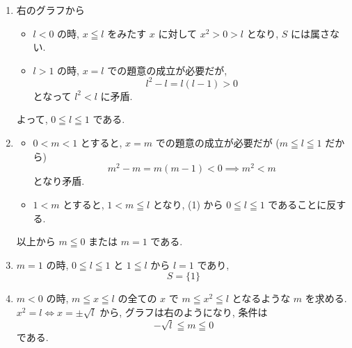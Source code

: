 \documentclass[../main.tex]{subfiles}
\begin{document}
\begin{enumerate}
  \item[(1)] 右のグラフから
    \begin{itemize}
      \item $l < 0$ の時, $x \leqq l$ をみたす $x$ に対して $x^2 > 0 > l$ となり, $S$ には属さない.
      \item $l > 1$ の時, $x = l$ での題意の成立が必要だが,
        \[
          l^2 - l = l(l-1) > 0
        \]
        となって $l^2 < l$ に矛盾.
    \end{itemize}
    よって, $0 \leqq l \leqq 1$ である.

    \begin{center}
    \end{center}

  \item[(2)]
    \begin{itemize}
      \item $0 < m < 1$ とすると, $x = m$ での題意の成立が必要だが ($m \leqq l \leqq 1$ だから)
        \[
          m^2 - m = m(m-1) < 0 \implies m^2 < m
        \]
        となり矛盾.
      \item $1 < m$ とすると, $1 < m \leqq l$ となり, (1) から $0 \leqq l \leqq 1$ であることに反する.
    \end{itemize}
    以上から $m \leqq 0$ または $m = 1$ である.

  \item[(3)] $m = 1$ の時, $0 \leqq l \leqq 1$ と $1 \leqq l$ から $l = 1$ であり,
    \[
      S = \{1\}
    \]

  \item[(4)] $m < 0$ の時, $m \leqq x \leqq l$ の全ての $x$ で $m \leqq x^2 \leqq l$ となるような $m$ を求める.
    $x^2 = l \iff x = \pm \sqrt{l}$ から, グラフは右のようになり, 条件は
    \[
      -\sqrt{l} \leqq m \leqq 0
    \]
    である.


\end{enumerate}
\end{document}
